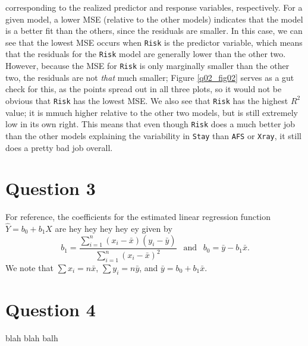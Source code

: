 \documentclass[10pt]{article}
\begin{document}
\begin{itemize}
    corresponding 
    to the realized predictor and response variables, respectively. For a given model, a lower MSE (relative to the other models) indicates that the model is 
    a better fit than the others, since the residuals are smaller. In this case, we can see that the lowest MSE occurs when \texttt{Risk} is the predictor
    variable, which means that the residuals for the \texttt{Risk} model are generally lower than the other two. However, because the MSE for \texttt{Risk}
    is only marginally smaller than the other two, the residuals are not \textit{that} much smaller; Figure \ref{q02_fig02} serves as a gut check for this, 
    as the points spread out in all three plots, so it would not be obvious that \texttt{Risk} has the lowest MSE. We also see that \texttt{Risk} has the 
    highest \(R^2\) value; it is mmuch higher relative to the other two models, but is still extremely low in its own right. This means that even though 
    \texttt{Risk} does a much better job than the other models explaining the variability in \texttt{Stay} than \texttt{AFS} or \texttt{Xray}, it still does 
    a pretty bad job overall. 
\end{itemize}

\section{Question 3} \noindent
For reference, the coefficients for the estimated linear regression function \(\hat{Y} = b_0 + b_1 X\) are hey hey hey hey ey
given by \[b_1 = \frac{\sum_{i=1}^n (x_i - \bar{x})(y_i - \bar{y})}{\sum_{i=1}^n(x_i - \bar{x})^2} ~~\text{ and }~~ b_0 = \bar{y} - b_1 \bar{x}.\] We note
that \(\sum x_i = n \bar{x}\), \(\sum y_i = n \bar{y}\), and \(\bar{y} = b_0 + b_1 \bar{x}\).

\section{Question 4} \noindent
blah blah balh
\end{document}
